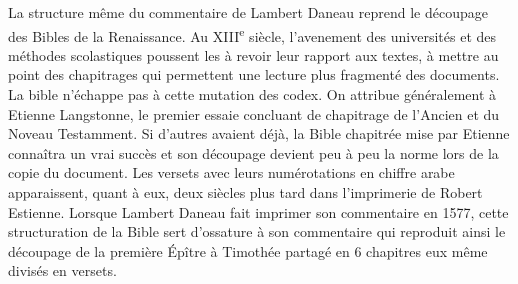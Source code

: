 \documentclass[11pt,french]{article}
\begin{document}
La structure même du commentaire de Lambert Daneau reprend le découpage des Bibles de la Renaissance. Au XIII\textsuperscript{e} siècle, l'avenement des universités et des méthodes scolastiques poussent les à revoir leur rapport aux textes, à mettre au point des chapitrages qui permettent une lecture plus fragmenté des documents. La bible n'échappe pas à cette mutation des codex. On attribue généralement à Etienne Langstonne, le premier essaie concluant de chapitrage de l'Ancien et du Noveau Testamment. Si d'autres avaient déjà, la Bible chapitrée mise par Etienne connaîtra un vrai succès et son découpage devient peu à peu la norme lors de la copie du document. Les versets avec leurs numérotations en chiffre arabe apparaissent, quant à eux, deux siècles plus tard dans l'imprimerie de Robert Estienne. Lorsque Lambert Daneau fait imprimer son commentaire en 1577, cette structuration de la Bible sert d'ossature à son commentaire qui reproduit ainsi le découpage de la première Épître à Timothée partagé en 6 chapitres eux même divisés en versets. 
\end{document}

